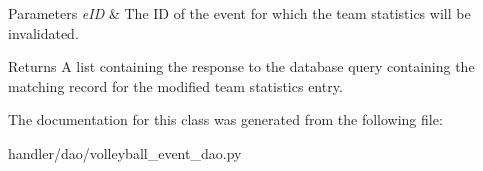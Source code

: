 \begin{DoxyParams}{Parameters}
{\em e\+ID} & The ID of the event for which the team statistics will be invalidated.\\
\hline
\end{DoxyParams}
\begin{DoxyReturn}{Returns}
A list containing the response to the database query containing the matching record for the modified team statistics entry. 
\end{DoxyReturn}


The documentation for this class was generated from the following file\+:\begin{DoxyCompactItemize}
\item 
handler/dao/volleyball\+\_\+event\+\_\+dao.\+py\end{DoxyCompactItemize}
